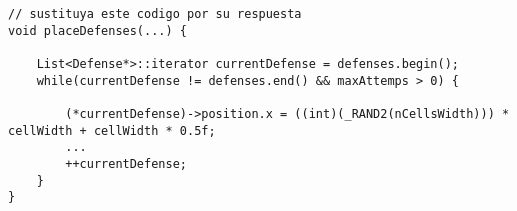 \begin{lstlisting}
// sustituya este codigo por su respuesta
void placeDefenses(...) {

    List<Defense*>::iterator currentDefense = defenses.begin();
    while(currentDefense != defenses.end() && maxAttemps > 0) {

        (*currentDefense)->position.x = ((int)(_RAND2(nCellsWidth))) * cellWidth + cellWidth * 0.5f;
        ...
        ++currentDefense;
    }
}
\end{lstlisting}